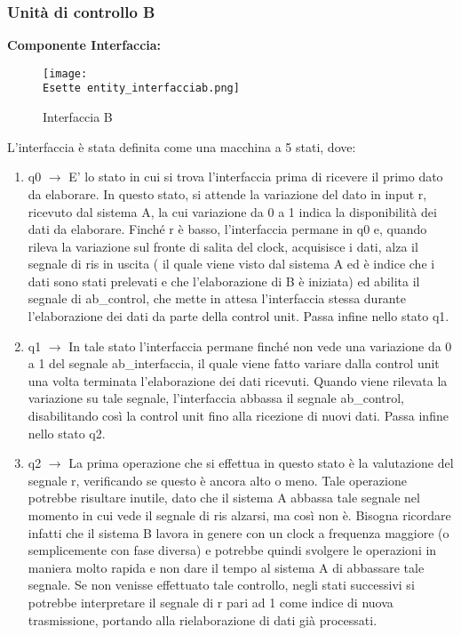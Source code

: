 \documentclass[12pt]{article}
\def \Esette {Allegati/Esercizio7/}
\begin{document}
\subsubsection{Unità di controllo B}
{\large \textbf{Componente Interfaccia:}}
\begin{figure}[ht]
    \centering
    \texttt{[image: \\Esette entity\_interfacciab.png]}
    \caption{Interfaccia B}
\end{figure}
L’interfaccia è stata definita come una macchina a 5 stati, dove:
\begin{enumerate}
    \item q0 $\rightarrow$ E' lo stato in cui si trova l’interfaccia prima di ricevere il primo dato da elaborare. In questo stato, si attende la variazione del dato in input r, ricevuto dal sistema A, la cui variazione da 0 a 1 indica la disponibilità dei dati da elaborare. Finché r è basso, l’interfaccia permane in q0 e, quando rileva la variazione sul fronte di salita del clock, acquisisce i dati, alza il segnale di ris in uscita ( il quale viene visto dal sistema A ed è indice che i dati sono stati prelevati e che l’elaborazione di B è iniziata) ed abilita il segnale di ab\_control, che mette in attesa l’interfaccia stessa durante l’elaborazione dei dati da parte della control unit. Passa infine nello stato q1.
    \item q1 $\rightarrow$ In tale stato l’interfaccia permane finché non vede una variazione da 0 a 1 del segnale ab\_interfaccia, il quale viene fatto variare dalla control unit una volta terminata l’elaborazione dei dati ricevuti. Quando viene rilevata la variazione su tale segnale, l’interfaccia abbassa il segnale ab\_control, disabilitando così la control unit fino alla ricezione di nuovi dati. Passa infine nello stato q2.
    \item q2 $\rightarrow$ La prima operazione che si effettua in questo stato è la valutazione del segnale r, verificando se questo è ancora alto o meno. Tale operazione potrebbe risultare inutile, dato che il sistema A abbassa tale segnale nel momento in cui vede il segnale di ris alzarsi, ma così non è. Bisogna ricordare infatti che il sistema B lavora in genere con un clock a frequenza maggiore (o semplicemente con fase diversa) e potrebbe quindi svolgere le operazioni in maniera molto rapida e non dare il tempo al sistema A di abbassare tale segnale. Se non venisse effettuato tale controllo, negli stati successivi si potrebbe interpretare il segnale di r pari ad 1 come indice di nuova trasmissione, portando alla rielaborazione di dati già processati.

\end{enumerate}
\end{document}

